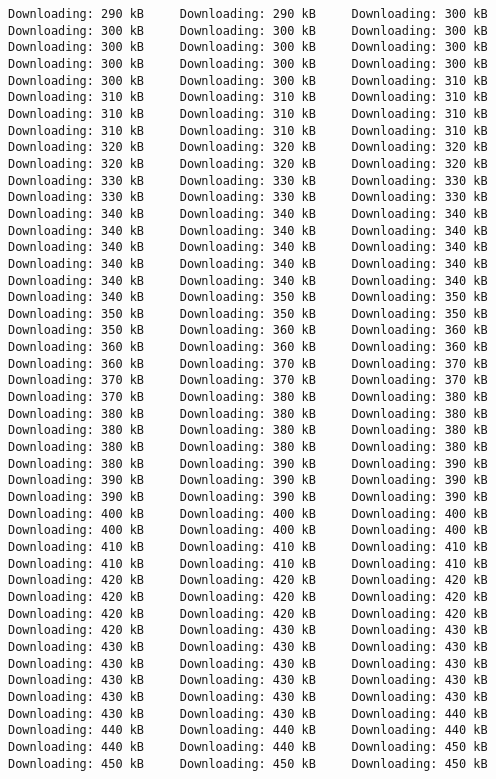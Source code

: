 \documentclass[gc, manuscript]{copernicus}
\begin{document}
\begin{verbatim}
Downloading: 290 kB     Downloading: 290 kB     Downloading: 300 kB     Downloading: 300 kB     Downloading: 300 kB     Downloading: 300 kB     Downloading: 300 kB     Downloading: 300 kB     Downloading: 300 kB     Downloading: 300 kB     Downloading: 300 kB     Downloading: 300 kB     Downloading: 300 kB     Downloading: 300 kB     Downloading: 310 kB     Downloading: 310 kB     Downloading: 310 kB     Downloading: 310 kB     Downloading: 310 kB     Downloading: 310 kB     Downloading: 310 kB     Downloading: 310 kB     Downloading: 310 kB     Downloading: 310 kB     Downloading: 320 kB     Downloading: 320 kB     Downloading: 320 kB     Downloading: 320 kB     Downloading: 320 kB     Downloading: 320 kB     Downloading: 330 kB     Downloading: 330 kB     Downloading: 330 kB     Downloading: 330 kB     Downloading: 330 kB     Downloading: 330 kB     Downloading: 340 kB     Downloading: 340 kB     Downloading: 340 kB     Downloading: 340 kB     Downloading: 340 kB     Downloading: 340 kB     Downloading: 340 kB     Downloading: 340 kB     Downloading: 340 kB     Downloading: 340 kB     Downloading: 340 kB     Downloading: 340 kB     Downloading: 340 kB     Downloading: 340 kB     Downloading: 340 kB     Downloading: 340 kB     Downloading: 350 kB     Downloading: 350 kB     Downloading: 350 kB     Downloading: 350 kB     Downloading: 350 kB     Downloading: 350 kB     Downloading: 360 kB     Downloading: 360 kB     Downloading: 360 kB     Downloading: 360 kB     Downloading: 360 kB     Downloading: 360 kB     Downloading: 370 kB     Downloading: 370 kB     Downloading: 370 kB     Downloading: 370 kB     Downloading: 370 kB     Downloading: 370 kB     Downloading: 380 kB     Downloading: 380 kB     Downloading: 380 kB     Downloading: 380 kB     Downloading: 380 kB     Downloading: 380 kB     Downloading: 380 kB     Downloading: 380 kB     Downloading: 380 kB     Downloading: 380 kB     Downloading: 380 kB     Downloading: 380 kB     Downloading: 390 kB     Downloading: 390 kB     Downloading: 390 kB     Downloading: 390 kB     Downloading: 390 kB     Downloading: 390 kB     Downloading: 390 kB     Downloading: 390 kB     Downloading: 400 kB     Downloading: 400 kB     Downloading: 400 kB     Downloading: 400 kB     Downloading: 400 kB     Downloading: 400 kB     Downloading: 410 kB     Downloading: 410 kB     Downloading: 410 kB     Downloading: 410 kB     Downloading: 410 kB     Downloading: 410 kB     Downloading: 420 kB     Downloading: 420 kB     Downloading: 420 kB     Downloading: 420 kB     Downloading: 420 kB     Downloading: 420 kB     Downloading: 420 kB     Downloading: 420 kB     Downloading: 420 kB     Downloading: 420 kB     Downloading: 430 kB     Downloading: 430 kB     Downloading: 430 kB     Downloading: 430 kB     Downloading: 430 kB     Downloading: 430 kB     Downloading: 430 kB     Downloading: 430 kB     Downloading: 430 kB     Downloading: 430 kB     Downloading: 430 kB     Downloading: 430 kB     Downloading: 430 kB     Downloading: 430 kB     Downloading: 430 kB     Downloading: 430 kB     Downloading: 440 kB     Downloading: 440 kB     Downloading: 440 kB     Downloading: 440 kB     Downloading: 440 kB     Downloading: 440 kB     Downloading: 450 kB     Downloading: 450 kB     Downloading: 450 kB     Downloading: 450 kB     
\end{verbatim}
\end{document}
